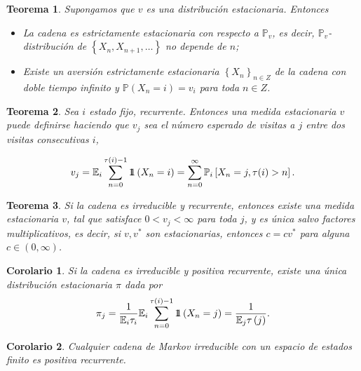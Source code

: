 \documentclass{article}
\newtheorem{Teo}{Teorema}[section]
\newtheorem{Cor}{Corolario}[section]
\newcommand{\esp}{\mathbb{E}}
\newcommand{\prob}{\mathbb{P}}
\newcommand{\indora}{\mbox{$1$\hspace{-0.8ex}$1$}}
\numberwithin{equation}{section}
\begin{document}
\begin{Teo}
Supongamos que $v$ es una distribuci\'on estacionaria. Entonces
\begin{itemize}
\item[i)] La cadena es estrictamente estacionaria con respecto a
$\prob_{v}$, es decir, $\prob_{v}$-distribuci\'on de $\left\{X_{n},X_{n+1},\ldots\right\}$ no depende de $n$;
\item[ii)] Existe un aversi\'on estrictamente estacionaria $\left\{X_{n}\right\}_{n\in Z}$ de la cadena con doble tiempo infinito y $\prob\left(X_{n}=i\right)=v_{i}$ para toda $n\in Z$.
\end{itemize}
\end{Teo}

\begin{Teo}
Sea $i$ estado fijo, recurrente. Entonces una medida estacionaria $v$ puede definirse haciendo que $v_{j}$ sea el n\'umero esperado de visitas a $j$ entre dos visitas consecutivas $i$,

\begin{equation}\label{Eq.3.1}
v_{j}=\esp_{i}\sum_{n=0}^{\tau(i)-1}\indora\left(X_{n}=i\right)=\sum_{n=0}^{\infty}\prob_{i}\left[X_{n}=j,\tau(i)>n\right].
\end{equation}
\end{Teo}

\begin{Teo}\label{Teo.3.3}
Si la cadena es irreducible y recurrente, entonces existe una medida estacionaria $v$, tal que satisface $0<v_{j}<\infty$ para toda $j$, y es \'unica salvo factores multiplicativos, es decir, si $v,v^{*}$ son estacionarias, entonces $c=cv^{*}$ para alguna $c\in\left(0,\infty\right)$.
\end{Teo}

\begin{Cor}\label{Cor.3.5}
Si la cadena es irreducible y positiva recurrente, existe una \'unica distribuci\'on estacionaria $\pi$ dada por
\begin{equation}
\pi_{j}=\frac{1}{\esp_{i}\tau_{i}}\esp_{i}\sum_{n=0}^{\tau\left(i\right)-1}\indora\left(X_{n}=j\right)=\frac{1}{\esp_{j}\tau\left(j\right)}.
\end{equation}
\end{Cor}

\begin{Cor}\label{Cor.3.6}
Cualquier cadena de Markov irreducible con un espacio de estados finito es positiva recurrente.
\end{Cor}
\end{document}
